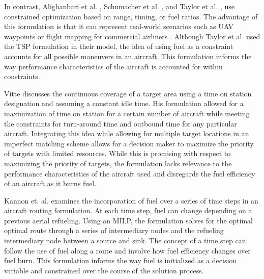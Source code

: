 In contrast, Alighanbari et al. \cite{Alighanbari}, Schumacher et al. \cite{Schumacher}, and Taylor et al. \cite{Taylor}, use constrained optimization based on range, timing, or fuel ratios. The advantage of this formulation is that it can represent real-world scenarios such as UAV waypoints \cite{Alighanbari} or flight mapping for commercial airliners \cite{Taylor}. Although Taylor et al. \cite{Taylor} used the TSP formulation in their model, the idea of using fuel as a constraint accounts for all possible maneuvers in an aircraft. This formulation informs the way performance characteristics of the aircraft is accounted for within constraints.\par
Vitte \cite{OptimizeBreguet} discusses the continuous coverage of a target area using a time on station designation and assuming a constant idle time. His formulation allowed for a maximization of time on station for a certain number of aircraft while meeting the constraints for turn-around time and outbound time for any particular aircraft. Integrating this idea while allowing for multiple target locations in an imperfect matching scheme allows for a decision maker to maximize the priority of targets with limited resources. While this is promising with respect to maximizing the priority of targets, the formulation lacks relevance to the performance characteristics of the aircraft used and disregards the fuel efficiency of an aircraft as it burns fuel.\par
Kannon et. al. \cite{Kannon} examines the incorporation of fuel over a series of time steps in an aircraft routing formulation. At each time step, fuel can change depending on a previous aerial refueling. Using an MILP, the formulation solves for the optimal optimal route through a series of intermediary nodes and the refueling intermediary node between a source and sink. The concept of a time step can follow the use of fuel along a route and involve how fuel efficiency changes over fuel burn. This formulation informs the way fuel is initialized as a decision variable and constrained over the course of the solution process.\par

